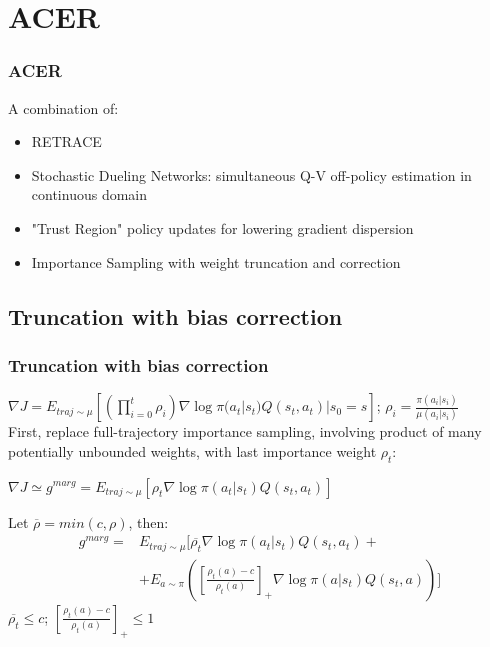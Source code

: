 \documentclass{beamer}
\begin{document}
\section{ACER}

\begin{frame}
\frametitle{ACER}
A combination of:
\begin{itemize}
\item RETRACE
\item Stochastic Dueling Networks: simultaneous Q-V off-policy estimation in continuous domain
\item "Trust Region" policy updates for lowering gradient dispersion
\item Importance Sampling with weight truncation and correction
\end{itemize}
\end{frame}

\subsection{Truncation with bias correction}

\begin{frame}
\frametitle{Truncation with bias correction}
 $\nabla J = E_{traj \sim \mu } \left[ \left( \prod_{i=0}^t \rho_i \right) \nabla \log \pi (a_t|s_t) Q(s_t, a_t) | s_0 = s \right]$;
 $\rho_i = \frac{\pi(a_i|s_i)}{\mu(a_i|s_i)}$\\
 \vspace{3mm}
 First, replace full-trajectory importance sampling, involving product of many potentially unbounded weights, with last importance weight $\rho_t$:
 
 \begin{center}
 $\nabla J \simeq g^{marg} = E_{traj \sim \mu } \left[  \rho_t \nabla \log \pi (a_t|s_t) Q(s_t, a_t) \right]$
 \end{center}
  
 \vspace{3mm}
Let $\overline{\rho} = min(c, \rho)$, then:
\begin{align*}
g^{marg} = & E_{traj \sim \mu } \big[ \overline{\rho_t} \nabla \log \pi (a_t|s_t) Q(s_t, a_t) + \\
& + E_{a \sim \pi} \left( \left[\frac{\rho_t(a) - c}{\rho_t(a)}\right]_+ \nabla \log \pi (a|s_t) Q(s_t, a) \right) \big]
\end{align*}
\vspace{3mm}
$\overline{\rho_t}  \leq c$; $\left[\frac{\rho_t(a) - c}{\rho_t(a)}\right]_+ \leq 1$
\end{frame}
\end{document}
